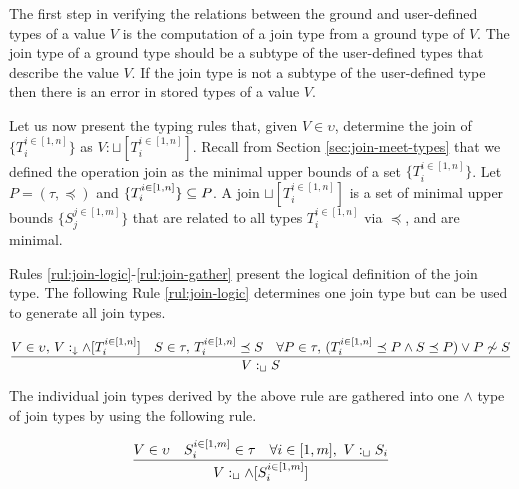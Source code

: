 \documentclass[runningheads]{llncs}
\newcommand{\darr}{\downarrow}
\newcommand{\llb}{\llbracket}
\newcommand{\rrb}{\rrbracket}
\newcommand{\vdasharr}{%
    \mathrel{%
        \vdash\hspace*{-5pt}%
        \raisebox{2.3pt}{\scalebox{.5}{\(\blacktriangleright\)}}%
    }%
}\newcommand{\D}{{\Delta}}
\newcommand{\memo}[1]{}
\newcommand{\nnotes}[1]{\indent\begin{small}-- \emph{#1}\hfill\break\end{small}}
\newcommand{\ennotes}[1]{\indent\begin{small}-- \emph{#1}\hfill\end{small}}
\begin{document}
The first step in verifying the relations between the ground and
user-defined types of a value $V$ is the computation of a join type
from a ground type of $V$. The join type of a ground type should be a
subtype of the user-defined types that describe the value $V$. If the
join type is not a subtype of the user-defined type then there is an
error in stored types of a value $V$.

Let us now present the typing rules that, given $V\in\upsilon$,
determine the join of $\{T_i^{i\in[1,n]}\}$ as
$V:\sqcup[T_i^{i\in[1,n]}]$. Recall from Section
\ref{sec:join-meet-types} that we defined the operation join as the
minimal upper bounds of a set $\{T_i^{i\in[1,n]}\}$. Let
$P=(\tau,\preceq)$ and $\{T_i^{i\in[1,n]}\}\subseteq\/P$. A join
$\sqcup[T_i^{i\in[1,n]}]$ is a set of minimal upper bounds
$\{S_j^{j\in[1,m]}\}$ that are related to all types $T_i^{i\in[1,n]}$
via $\preceq$, and are minimal.


Rules \ref{rul:join-logic}-\ref{rul:join-gather} present the logical
definition of the join type. The following Rule \ref{rul:join-logic}
determines one join type but can be used to generate all join types.


\begin{equation}
\label{rul:join-logic}
\dfrac{V\in\upsilon,\, \/V:_\darr\land[T_i^{i\in[1,n]}]\quad\/S\in\tau,\, T_i^{i\in[1,n]}\preceq\/S\quad\forall\/P\in\tau,\, (T_i^{i\in[1,n]}\preceq\/P\land\/S\preceq\/P)\lor\/P\not\sim\/S}
      {V:_\sqcup\/S}
\end{equation}

The individual join types derived by the above rule are gathered
into one $\land$ type of join types by using the following rule.

\begin{equation}
\label{rul:join-gather}
\dfrac{V\in\upsilon\quad\/S_i^{i\in[1,m]}\in\tau\quad\forall\/i\in[1,m],\ V:_\sqcup\/S_i}
{V:_{\sqcup}\land[S_i^{i\in[1,m]}]}
\end{equation}


\memo{
The following Rule \ref{rul:join-alg} derives the complete join type
in one step. The operator join $\sqcup[T_i^{i\in[1,n]}]$ returns as a
result a set of minimal upper bound types of $T_i^{i\in[1,n]}$. Since
all the join types are valid types of $V$, we can group them into one
$\land$ type.

\begin{equation}
\label{rul:join-alg} 
\dfrac{V\in\upsilon\quad\vdasharr\/V:_\darr\land[T_i^{i\in[1,n]}]\quad\/\vdasharr\{S_j^{j\in[1,m]}\}=\sqcup[T_i^{i\in[1,n]}]}
      {\vdasharr\/V:_\sqcup\land[S_j^{j\in[1,m]}]}
\end{equation}}
\end{document}
